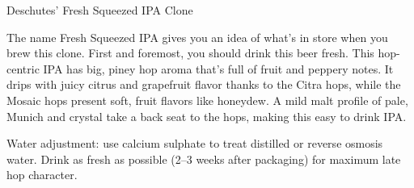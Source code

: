 \begin{recipie}{Deschutes' Fresh Squeezed IPA Clone}

\begin{aboutblock}
The name Fresh Squeezed IPA gives you an idea of what's in store when you brew
this clone. First and foremost, you should drink this beer fresh. This hop-centric
IPA has big, piney hop aroma that's full of fruit and peppery notes. It drips with
juicy citrus and grapefruit flavor thanks to the Citra hops, while the Mosaic hops
present soft, fruit flavors like honeydew. A mild malt profile of pale, Munich and
crystal take a back seat to the hops, making this easy to drink IPA. \sourceaha
\end{aboutblock}


\begin{methodandtiming}
 
\begin{mashsteps}
\end{mashsteps}

\begin{fermentationsteps}
\end{fermentationsteps}

\begin{directions}
Water adjustment: use  calcium sulphate to treat distilled or
reverse osmosis water. Drink as fresh as possible (2--3 weeks after packaging)
for maximum late hop character.
\end{directions}

\end{methodandtiming}

\pagebreak

\begin{ingredientsblock}

\begin{malts}
\end{malts}

\begin{hops}

\end{hops}


\end{ingredientsblock}

\end{recipie}

